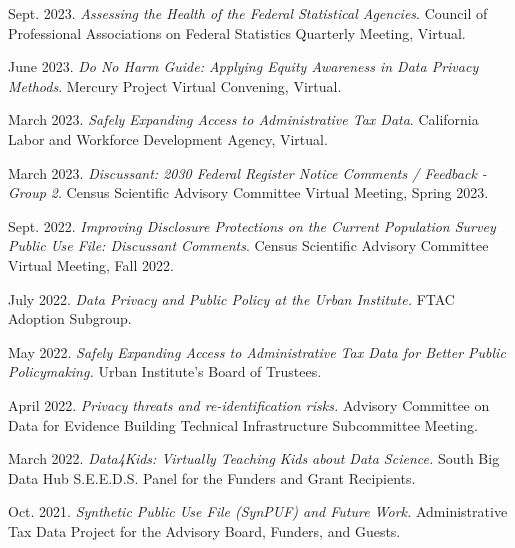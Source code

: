 \begin{etaremune}[topsep=0pt, itemsep=3pt, partopsep=0pt, parsep=0pt]

    \item Sept. 2023. \textit{Assessing the Health of the Federal Statistical Agencies}. Council of Professional Associations on Federal Statistics Quarterly Meeting, Virtual.

    \item June 2023. \textit{Do No Harm Guide: Applying Equity Awareness in Data Privacy Methods}. Mercury Project Virtual Convening, Virtual.
    
    \item March 2023. \textit{Safely Expanding Access to Administrative Tax Data}. California Labor and Workforce Development Agency, Virtual.
    
    \item March 2023. \textit{Discussant: 2030 Federal Register Notice Comments / Feedback - Group 2}. Census Scientific Advisory Committee Virtual Meeting, Spring 2023.
    
    \item Sept. 2022. \textit{Improving Disclosure Protections on the Current Population Survey Public Use File: Discussant Comments}. Census Scientific Advisory Committee Virtual Meeting, Fall 2022.
    
    \item July 2022. \textit{Data Privacy and Public Policy at the Urban Institute.} FTAC Adoption Subgroup.
    
    \item May 2022. \textit{Safely Expanding Access to Administrative Tax Data for Better Public Policymaking.} Urban Institute's Board of Trustees.
    
    \item April 2022. \textit{Privacy threats and re-identification risks.} Advisory Committee on Data for Evidence Building Technical Infrastructure Subcommittee Meeting.
    
    \item March 2022. \textit{Data4Kids: Virtually Teaching Kids about Data Science.} South Big Data Hub S.E.E.D.S. Panel for the Funders and Grant Recipients.
    
    \item Oct. 2021. \textit{Synthetic Public Use File (SynPUF) and Future Work.} Administrative Tax Data Project for the Advisory Board, Funders, and Guests.
    

\end{etaremune}
